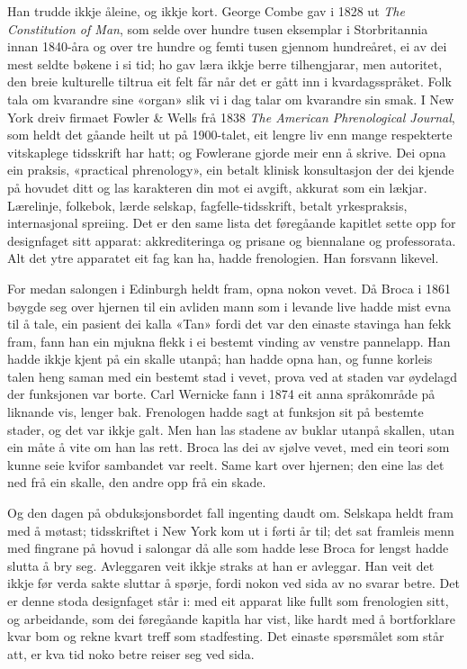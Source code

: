 Han trudde ikkje åleine, og ikkje kort. George Combe gav i 1828 ut \emph{The Constitution of Man}, som selde over hundre tusen eksemplar i Storbritannia innan 1840-åra og over tre hundre og femti tusen gjennom hundreåret, ei av dei mest seldte bøkene i si tid; ho gav læra ikkje berre tilhengjarar, men autoritet, den breie kulturelle tiltrua eit felt får når det er gått inn i kvardagsspråket. Folk tala om kvarandre sine «organ» slik vi i dag talar om kvarandre sin smak. I New York dreiv firmaet Fowler \& Wells frå 1838 \emph{The American Phrenological Journal}, som heldt det gåande heilt ut på 1900-talet, eit lengre liv enn mange respekterte vitskaplege tidsskrift har hatt; og Fowlerane gjorde meir enn å skrive. Dei opna ein praksis, «practical phrenology», ein betalt klinisk konsultasjon der dei kjende på hovudet ditt og las karakteren din mot ei avgift, akkurat som ein lækjar. Lærelinje, folkebok, lærde selskap, fagfelle-tidsskrift, betalt yrkespraksis, internasjonal spreiing. Det er den same lista det føregåande kapitlet sette opp for designfaget sitt apparat: akkrediteringa og prisane og biennalane og professorata. Alt det ytre apparatet eit fag kan ha, hadde frenologien. Han forsvann likevel.

For medan salongen i Edinburgh heldt fram, opna nokon vevet. Då Broca i 1861 bøygde seg over hjernen til ein avliden mann som i levande live hadde mist evna til å tale, ein pasient dei kalla «Tan» fordi det var den einaste stavinga han fekk fram, fann han ein mjukna flekk i ei bestemt vinding av venstre pannelapp. Han hadde ikkje kjent på ein skalle utanpå; han hadde opna han, og funne korleis talen heng saman med ein bestemt stad i vevet, prova ved at staden var øydelagd der funksjonen var borte. Carl Wernicke fann i 1874 eit anna språkområde på liknande vis, lenger bak. Frenologen hadde sagt at funksjon sit på bestemte stader, og det var ikkje galt. Men han las stadene av buklar utanpå skallen, utan ein måte å vite om han las rett. Broca las dei av sjølve vevet, med ein teori som kunne seie kvifor sambandet var reelt. Same kart over hjernen; den eine las det ned frå ein skalle, den andre opp frå ein skade.

Og den dagen på obduksjonsbordet fall ingenting daudt om. Selskapa heldt fram med å møtast; tidsskriftet i New York kom ut i førti år til; det sat framleis menn med fingrane på hovud i salongar då alle som hadde lese Broca for lengst hadde slutta å bry seg. Avleggaren veit ikkje straks at han er avleggar. Han veit det ikkje før verda sakte sluttar å spørje, fordi nokon ved sida av no svarar betre. Det er denne stoda designfaget står i: med eit apparat like fullt som frenologien sitt, og arbeidande, som dei føregåande kapitla har vist, like hardt med å bortforklare kvar bom og rekne kvart treff som stadfesting. Det einaste spørsmålet som står att, er kva tid noko betre reiser seg ved sida.

